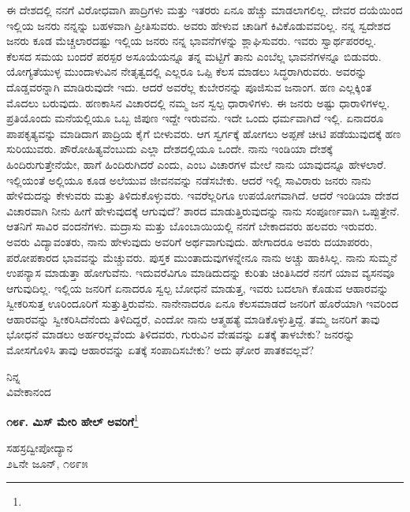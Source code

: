ಈ ದೇಶದಲ್ಲಿ ನನಗೆ ವಿರೋಧವಾಗಿ ಪಾದ್ರಿಗಳು ಮತ್ತು ಇತರರು ಏನೂ ಹೆಚ್ಚು ಮಾಡಲಾಗಲಿಲ್ಲ. ದೇವರ ದಯೆಯಿಂದ ಇಲ್ಲಿಯ ಜನರು ನನ್ನನ್ನು ಬಹಳವಾಗಿ ಪ್ರೀತಿಸುವರು. ಅವರು ಹೇಳುವ ಚಾಡಿಗೆ ಕಿವಿಕೊಡುವವರಿಲ್ಲ. ನನ್ನ ಸ್ವದೇಶದ ಜನರು ಕೂಡ ಮೆಚ್ಚಲಾರದಷ್ಟು ಇಲ್ಲಿಯ ಜನರು ನನ್ನ ಭಾವನೆಗಳನ್ನು ಶ್ಲಾಘಿಸುವರು. ಇವರು ಸ್ವಾರ್ಥಪರರಲ್ಲ. ಕೆಲಸದ ಸಮಯ ಬಂದರೆ ಪರಸ್ಪರ ಅಸೂಯೆಯನ್ನೂ ತನ್ನ ಮಟ್ಟಿಗೆ ತಾನು ಎಂಬೆಲ್ಲ ಭಾವನೆಗಳನ್ನೂ ಬಿಡುವರು. ಯೋಗ್ಯತೆಯುಳ್ಳ ಮುಂದಾಳುವಿನ ನೇತೃತ್ವದಲ್ಲಿ ಎಲ್ಲರೂ ಒಪ್ಪಿ ಕೆಲಸ ಮಾಡಲು ಸಿದ್ಧರಾಗಿರುವರು. ಅವರನ್ನು ದೊಡ್ಡವರನ್ನಾಗಿ ಮಾಡಿರುವುದೇ ಇದು. ಆದರೆ ಅವರೆಲ್ಲ ಕುಬೇರನನ್ನು ಪೂಜಿಸುವ ಜನಾಂಗ. ಹಣ ಎಲ್ಲಕ್ಕಿಂತ ಮೊದಲು ಬರುವುದು. ಹಣಕಾಸಿನ ವಿಚಾರದಲ್ಲಿ ನಮ್ಮ ಜನ ಸ್ವಲ್ಪ ಧಾರಾಳಿಗಳು. ಈ ಜನರು ಅಷ್ಟು ಧಾರಾಳಿಗಳಲ್ಲ. ಪ್ರತಿಯೊಂದು ಮನೆಯಲ್ಲಿಯೂ ಒಬ್ಬ ಜಿಪುಣ ಇದ್ದೇ ಇರುವನು. ಇದೇ ಒಂದು ಧರ್ಮವಾಗಿದೆ ಇಲ್ಲಿ. ಏನಾದರೂ ಪಾಪಕೃತ್ಯವನ್ನು ಮಾಡಿದಾಗ ಪಾದ್ರಿಯ ಕೈಗೆ ಬೀಳುವರು. ಆಗ ಸ್ವರ್ಗಕ್ಕೆ ಹೋಗಲು ಅಪ್ಪಣೆ ಚೀಟಿ ಪಡೆಯುವುದಕ್ಕೆ ಹಣ ಸುರಿಯುವರು. ಪೌರೋಹಿತ್ಯವೆಂಬುದು ಎಲ್ಲಾ ದೇಶದಲ್ಲಿಯೂ ಒಂದೇ. ನಾನು ಇಂಡಿಯಾ ದೇಶಕ್ಕೆ ಹಿಂದಿರುಗುತ್ತೇನೆಯೇ, ಹಾಗೆ ಹಿಂದಿರುಗಿದರೆ ಎಂದು, ಎಂಬ ವಿಚಾರಗಳ ಮೇಲೆ ನಾನು ಯಾವುದನ್ನೂ ಹೇಳಲಾರೆ. ಇಲ್ಲಿಯಂತೆ ಅಲ್ಲಿಯೂ ಕೂಡ ಅಲೆಯುವ ಜೀವನವನ್ನು ನಡೆಸಬೇಕು. ಆದರೆ ಇಲ್ಲಿ ಸಾವಿರಾರು ಜನರು ನಾನು ಹೇಳಿದುದನ್ನು ಕೇಳುವರು ಮತ್ತು ತಿಳಿದುಕೊಳ್ಳುವರು. ಇವರೆಲ್ಲರಿಗೂ ಉಪಯೋಗವಾಗಿದೆ. ಆದರೆ ಇಂಡಿಯಾ ದೇಶದ ವಿಚಾರವಾಗಿ ನೀನು ಹೀಗೆ ಹೇಳುವುದಕ್ಕೆ ಆಗುವುದೆ? ಶಾರದ ಮಾಡುತ್ತಿರುವುದನ್ನು ನಾನು ಸಂಪೂರ್ಣವಾಗಿ ಒಪ್ಪುತ್ತೇನೆ. ಆತನಿಗೆ ಸಾವಿರ ವಂದನೆಗಳು. ಮದ್ರಾಸು ಮತ್ತು ಬೊಂಬಾಯಿಯಲ್ಲಿ ನನಗೆ ಬೇಕಾದವರು ಹಲವರು ಇರುವರು. ಅವರು ವಿದ್ಯಾವಂತರು, ನಾನು ಹೇಳುವುದು ಅವರಿಗೆ ಅರ್ಥವಾಗುವುದು. ಹೇಗಾದರೂ ಅವರು ದಯಾಪರರು, ಪರೋಪಕಾರದ ಭಾವವನ್ನು ಮೆಚ್ಚುವರು. ಪುಸ್ತಕ ಮುಂತಾದುವುಗಳನ್ನೇನೂ ನಾನು ಅಚ್ಚು ಹಾಕಿಸಿಲ್ಲ. ನಾನು ಸುಮ್ಮನೆ ಉಪನ್ಯಾಸ ಮಾಡುತ್ತಾ ಹೋಗುವೆನು. ಇದುವರೆವಿಗೂ ಮಾಡಿದುದನ್ನು ಕುರಿತು ಚಿಂತಿಸಿದರೆ ನನಗೆ ಯಾವ ವ್ಯಸನವೂ ಆಗುವುದಿಲ್ಲ. ಇಲ್ಲಿಯ ಜನರಿಗೆ ಏನಾದರೂ ಸ್ವಲ್ಪ ಬೋಧನೆ ಮಾಡುತ್ತ, ಇವರು ಬದಲಾಗಿ ಕೊಡುವ ಆಹಾರವನ್ನು ಸ್ವೀಕರಿಸುತ್ತ ಊರಿಂದೂರಿಗೆ ಸುತ್ತುತ್ತಿರುವೆನು. ನಾನೇನಾದರೂ ಏನೂ ಕೆಲಸಮಾಡದೆ ಜನರಿಗೆ ಹೊರೆಯಾಗಿ ಇವರಿಂದ ಆಹಾರವನ್ನು ಸ್ವೀಕರಿಸಿದೆನೆಂದು ತಿಳಿದಿದ್ದರೆ, ಎಂದೋ ನಾನು ಆತ್ಮಹತ್ಯೆ ಮಾಡಿಕೊಳ್ಳುತ್ತಿದ್ದೆ. ತಮ್ಮ ಜನರಿಗೆ ತಾವು ಭೋಧನೆ ಮಾಡಲು ಅರ್ಹರಲ್ಲವೆಂದು ತಿಳಿದವರು, ಗುರುವಿನ ವೇಷವನ್ನು ಏತಕ್ಕೆ ತಾಳಬೇಕು? ಜನರನ್ನು ಮೋಸಗೊಳಿಸಿ ತಾವು ಆಹಾರವನ್ನು ಏತಕ್ಕೆ ಸಂಪಾದಿಸಬೇಕು? ಅದು ಘೋರ ಪಾತಕವಲ್ಲವೆ?

\vspace{-0.5cm}

{\flushright
ನಿನ್ನ\\ವಿವೇಕಾನಂದ\par}

\begin{center}
\textbf{೧೮೯. ಮಿಸ್ ಮೇರಿ ಹೇಲ್‌ ಅವರಿಗೆ}\footnote{}
\end{center}

\vspace{-0.5cm}

\begin{flushright}
ಸಹಸ್ರದ್ವೀಪೋದ್ಯಾನ\\೨೬ನೇ ಜೂನ್, ೧೮೯೫
\end{flushright}


